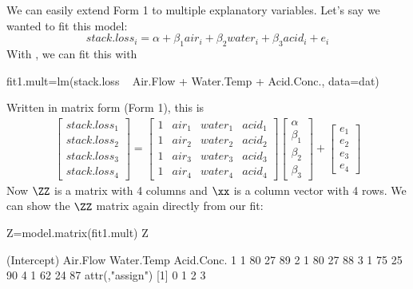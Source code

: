 We can easily extend Form 1 to multiple explanatory variables.  Let's say we wanted to fit this model:
\begin{equation}\label{eqn:stacklossi.mult}
stack.loss_i = \alpha + \beta_1 air_i + \beta_2 water_i + \beta_3 acid_i + e_i 
\end{equation}
With \verb@lm@, we can fit this with
\begin{Schunk}
\begin{Sinput}
 fit1.mult=lm(stack.loss ~ Air.Flow + Water.Temp + Acid.Conc., data=dat)
\end{Sinput}
\end{Schunk}
Written in matrix form (Form 1), this is
\begin{equation}\label{eqn:stackloss.form1.mult}
\begin{gathered}
\begin{bmatrix}stack.loss_1\\stack.loss_2\\stack.loss_3\\stack.loss_4\end{bmatrix}
= 
\begin{bmatrix}1&air_1&water_1&acid_1\\1&air_2&water_2&acid_2\\1&air_3&water_3&acid_3\\1&air_4&water_4&acid_4\end{bmatrix}
\begin{bmatrix}\alpha\\ \beta_1 \\ \beta_2 \\ \beta_3\end{bmatrix}
+
\begin{bmatrix}e_1\\e_2\\e_3\\e_4\end{bmatrix}
\end{gathered}
\end{equation}
Now $\ZZ$ is a matrix with 4 columns and $\xx$ is a column vector with 4 rows.  We can show the $\ZZ$ matrix again directly from our \verb@lm@ fit:
\begin{Schunk}
\begin{Sinput}
 Z=model.matrix(fit1.mult)
 Z
\end{Sinput}
\begin{Soutput}
  (Intercept) Air.Flow Water.Temp Acid.Conc.
1           1       80         27         89
2           1       80         27         88
3           1       75         25         90
4           1       62         24         87
attr(,"assign")
[1] 0 1 2 3
\end{Soutput}
\end{Schunk}


